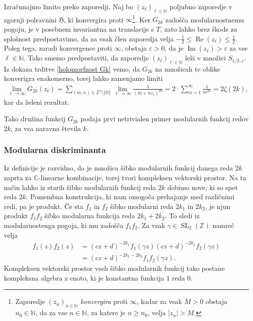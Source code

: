 \documentclass[mat1]{fmfdelo}
\numberwithin{equation}{section}
\newcommand{\N}{\mathbb N}
\newcommand{\Z}{\mathbb Z}
\newcommand{\C}{\mathbb C}
\newcommand{\HH}{\mathfrak{H}}
\newcommand{\abs}[1]{\left\lvert #1 \right\rvert}
\renewcommand\Re{\operatorname{Re}}%
\renewcommand\Im{\operatorname{Im}}%
\theoremstyle{definition}
\begin{document}
\begin{dokaz}
    Izračunajmo limito preko zaporedji. Naj bo $(z_\ell)_{\ell\in\N}$ poljubno zaporedje v zgornji polravnini $\HH$, ki konvergira proti $\infty$\footnote{Zaporedje $(z_n)_{n \in \N}$ \emph{konvergira} proti $\infty$, kadar za vsak $M > 0$ obstaja $n_0 \in \N$, da za vse $n \in \N$, za katere je $n \geq n_0$, velja $\abs{z_n} > M$.}. Ker $G_{2k}$ zadošča modularnostnemu pogoju, je v posebnem invariantna na translacije s $T$, zato lahko brez škode za splošnost predpostavimo, da za vsak člen zaporedja velja $-\frac12 \leq \Re(z_\ell) \leq \frac12$. Poleg tega, zaradi konvergence proti $\infty$, obstaja $\varepsilon > 0$, da je $\Im(z_\ell) > \varepsilon$ za vse $\ell \in \N$.  Tako smemo predpostaviti, da zaporedje $(z_\ell)_{\ell \in\N}$ leži v množici $S_{1/2, \varepsilon}$. Iz dokaza trditve \ref{holomorfnost Gk} vemo, da $G_{2k}$ na množicah te oblike konverigra enakomerno, torej lahko zamenjamo limiti
    \begin{gather*}
        \lim_{\ell \to \infty}G_{2k}(z_\ell) = 
        \sum_{(m,n) \in \Z^2\setminus\{0\}} \lim_{\ell \to \infty} \frac{1}{(m + nz_\ell)^{2k}} = 
        2 \cdot \sum_{m = 1}^\infty \frac{1}{m^{2k}} = 2\zeta(2k),
    \end{gather*}
    kar da želeni rezultat.
\end{dokaz}

Tako družina funkcij $G_{2k}$ podaja prvi netrivialen primer modularnih funkcij redov $2k$, za vsa naravna števila $k$.


\subsubsection*{Modularna diskriminanta}
Iz definicije je razvidno, da je množica šibko modularnih funkcij danega reda $2k$ zaprta za $\C$-linearne kombinacije, torej tvori kompleksen vektorski prostor. Na ta način lahko iz starih šibko modularnih funkcij reda $2k$ dobimo nove, ki so spet reda $2k$. Pomembna konstrukcija, ki nam omogoča prehajanje med različnimi redi, pa je produkt. Če sta $f_1$ in $f_2$ šibko modularni reda $2k_1$ in $2k_2$, je njun produkt $f_1f_2$ šibko modularna funkcija reda $2k_1 + 2k_2$. To sledi iz modularnostenga pogoja, ki mu zadošča $f_1f_2$. Za vsak $\gamma \in \operatorname{SL}_2(\Z)$ namreč velja
\begin{align*}
    f_1(z)f_2(z) &= 
    (cz + d)^{-2k_1} f_1\left(\gamma z\right)(cz + d)^{-2k_2} f_2\left(\gamma z\right) \\
    &= (cz + d)^{-2k_1 - 2k_2} f_1f_2\left(\gamma z\right).
\end{align*}
Kompleksen vektorski prostor vseh šibko modularnih funkcij tako postane kompleksna algebra z enoto, ki je konstantna funkcija $1$ reda $0$.
\end{document}
